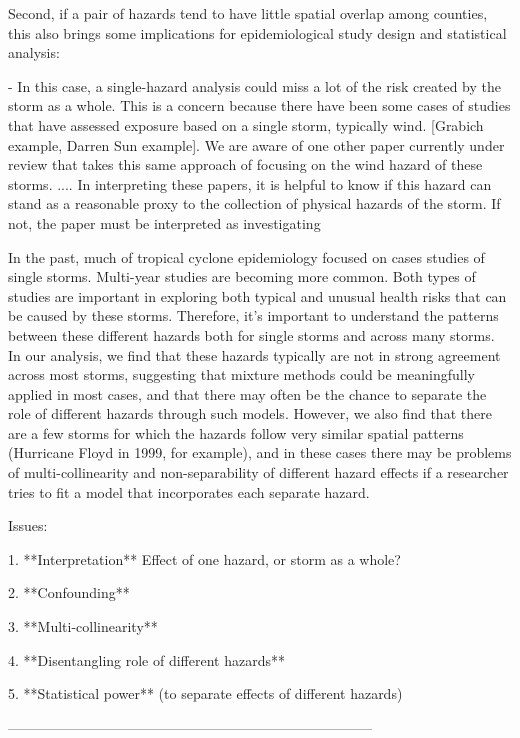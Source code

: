 Second, if a pair of hazards tend to have little spatial overlap among 
counties, this also brings some implications for epidemiological study design
and statistical analysis: 

- In this case, a single-hazard analysis could miss a lot of the risk created
by the storm as a whole. This is a concern because there have been some cases
of studies that have assessed exposure based on a single storm, typically wind.
[Grabich example, Darren Sun example]. We are aware of one other paper 
currently under review that takes this same approach of focusing on the wind
hazard of these storms. .... In interpreting these papers, it is helpful to
know if this hazard can stand as a reasonable proxy to the collection of 
physical hazards of the storm. If not, the paper must be interpreted as 
investigating

In the past, much of tropical cyclone epidemiology focused on cases studies of
single storms. Multi-year studies are becoming more common. Both types of
studies are important in exploring both typical and unusual health risks that
can be caused by these storms. Therefore, it's important to understand the
patterns between these different hazards both for single storms and across many
storms. In our analysis, we find that these hazards typically are not in strong
agreement across most storms, suggesting that mixture methods could be
meaningfully applied in most cases, and that there may often be the chance to
separate the role of different hazards through such models. However, we also
find that there are a few storms for which the hazards follow very similar
spatial patterns (Hurricane Floyd in 1999, for example), and in these cases
there may be problems of multi-collinearity and non-separability of different
hazard effects if a researcher tries to fit a model that incorporates each
separate hazard.



Issues: 

1. **Interpretation** Effect of one hazard, or storm as a whole?


2. **Confounding**


3. **Multi-collinearity**


4. **Disentangling role of different hazards**


5. **Statistical power** (to separate effects of different hazards)



------------------------------------------------------------------------------


